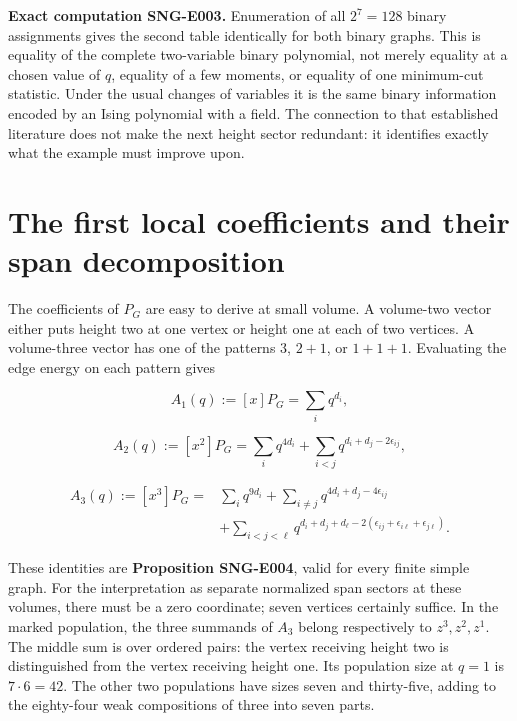 \documentclass[
  11pt,
  a4paper,
]{report}
\begin{document}
\textbf{Exact computation SNG-E003.} Enumeration of all \(2^7=128\)
binary assignments gives the second table identically for both binary
graphs. This is equality of the complete two-variable binary polynomial,
not merely equality at a chosen value of \(q\), equality of a few
moments, or equality of one minimum-cut statistic. Under the usual
changes of variables it is the same binary information encoded by an
Ising polynomial with a field. The connection to that established
literature does not make the next height sector redundant: it identifies
exactly what the example must improve upon.

\hypertarget{the-first-local-coefficients-and-their-span-decomposition}{%
\section{The first local coefficients and their span
decomposition}\label{the-first-local-coefficients-and-their-span-decomposition}}

The coefficients of \(P_G\) are easy to derive at small volume. A
volume-two vector either puts height two at one vertex or height one at
each of two vertices. A volume-three vector has one of the patterns
\(3\), \(2+1\), or \(1+1+1\). Evaluating the edge energy on each pattern
gives

\[
A_1(q):=[x]P_G=\sum_iq^{d_i},
\]

\[
A_2(q):=[x^2]P_G=
\sum_iq^{4d_i}+\sum_{i<j}q^{d_i+d_j-2\epsilon_{ij}},
\]

\[
\begin{aligned}
A_3(q):=[x^3]P_G={}&\sum_iq^{9d_i}
+\sum_{i\ne j}q^{4d_i+d_j-4\epsilon_{ij}}\\
&+\sum_{i<j<\ell}q^{d_i+d_j+d_\ell
-2(\epsilon_{ij}+\epsilon_{i\ell}+\epsilon_{j\ell})}.
\end{aligned}
\]

These identities are \textbf{Proposition SNG-E004}, valid for every
finite simple graph. For the interpretation as separate normalized span
sectors at these volumes, there must be a zero coordinate; seven
vertices certainly suffice. In the marked population, the three summands
of \(A_3\) belong respectively to \(z^3,z^2,z^1\). The middle sum is
over ordered pairs: the vertex receiving height two is distinguished
from the vertex receiving height one. Its population size at \(q=1\) is
\(7\cdot6=42\). The other two populations have sizes seven and
thirty-five, adding to the eighty-four weak compositions of three into
seven parts.
\end{document}
